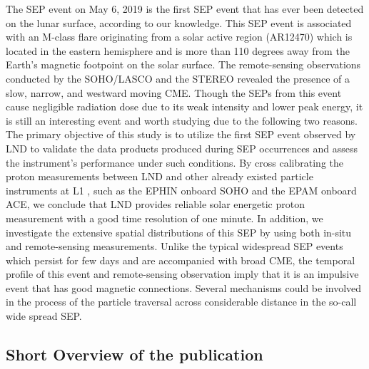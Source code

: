 The \ac{SEP} event on May 6, 2019 is the first \ac{SEP} event that has ever been detected on the lunar surface, according to our knowledge. 
This \ac{SEP} event is associated with an M-class flare originating from a solar active region (AR12470) which is located in the eastern hemisphere and is more than 110 degrees away from the Earth's magnetic footpoint on the solar surface. The remote-sensing observations conducted by the \ac{SOHO}/\ac{LASCO} and the \ac{STEREO} revealed the presence of a slow, narrow, and westward moving \ac{CME}. 
Though the \acp{SEP} from this event cause negligible radiation dose due to its weak intensity and lower peak energy, it is still an interesting event and worth studying due to the following two reasons.
The primary objective of this study is to utilize the first \ac{SEP} event observed by \ac{LND} to validate the data products produced during \ac{SEP} occurrences and assess the instrument's performance under such conditions. By cross calibrating the proton measurements between \ac{LND} and other already existed particle instruments at \ac{L1} , such as the \ac{EPHIN} onboard \ac{SOHO} and the \ac{EPAM} onboard \ac{ACE}, we conclude that \ac{LND} provides reliable solar energetic proton measurement with a good time resolution of one minute.
In addition, we investigate the extensive spatial distributions of this \ac{SEP} by using both in-situ and remote-sensing measurements. Unlike the typical widespread \ac{SEP} events which persist for few days and are accompanied with broad \ac{CME}, the temporal profile of this event and remote-sensing observation imply that it is an impulsive event that has good magnetic connections. Several mechanisms could be involved in the process of the particle traversal across considerable distance in the so-call wide spread \acs{SEP}. 

\subsection*{Short Overview of the publication}

